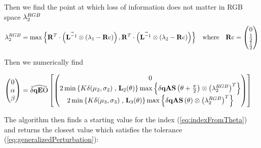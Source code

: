 Then we find the point at which loss of information does not matter in RGB space $\lambda^{RGB}_2$ 
\begin{align*}
\discard^{RGB}_2 &= \max \left\{ 
  \R^{T} \cdot \left( \nS \otimes \left( \discard_1 - \Rc \right) \right) , 
  \R^{T} \cdot \left( \nS \otimes \left( \discard_2 - \Rc \right) \right) 
\right\} &
 \text{where} \quad \Rc=
\begin{pmatrix}
                 0   \\
                 \frac{1}{2}    \\
                 \frac{1}{2}     \\
\end{pmatrix} 
\end{align*}

Then we numerically find 

\begin{align*}
 \begin{pmatrix}  0   \\   \alpha   \\  \beta   \\ \end{pmatrix}     %
        &=\dqEO\left[ \begin{pmatrix} 
         0 \\ 
         2 \min\left\{K \delta(\mu_2,\sigma_2) \right. ,  \left. \mathbf{L}_2(\theta) \right\}  \max \left\{\dqas[\theta + \frac{\pi}{2}]  \otimes \left(\discard^{RGB}_2 \right)^T \right\}  \\
         2 \min\left\{K \delta(\mu_3,\sigma_3) \right. ,  \left. \mathbf{L}_3(\theta) \right\}  \max \left\{\dqas[\theta                       ] \otimes \left(\discard^{RGB}_2 \right)^T \right\}   \\
          \end{pmatrix} \right]
\end{align*}

The algorithm then finds a starting value for the index (\ref{eq:indexFromTheta}) and returns the closest value which satisfies the tolerance (\ref{eq:generalizedPerturbation}):

